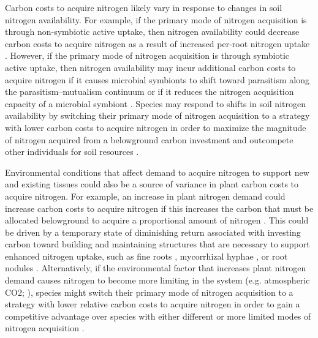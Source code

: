 Carbon costs to acquire nitrogen likely vary in response to changes in soil nitrogen availability. For example, if the primary mode of nitrogen acquisition is through non-symbiotic active uptake, then nitrogen availability could decrease carbon costs to acquire nitrogen as a result of increased per-root nitrogen uptake . However, if the primary mode of nitrogen acquisition is through symbiotic active uptake, then nitrogen availability may incur additional carbon costs to acquire nitrogen if it causes microbial symbionts to shift toward parasitism along the parasitism–mutualism continuum  or if it reduces the nitrogen acquisition capacity of a microbial symbiont . Species may respond to shifts in soil nitrogen availability by switching their primary mode of nitrogen acquisition to a strategy with lower carbon costs to acquire nitrogen in order to maximize the magnitude of nitrogen acquired from a belowground carbon investment and outcompete other individuals for soil resources .

Environmental conditions that affect demand to acquire nitrogen to support new and existing tissues could also be a source of variance in plant carbon costs to acquire nitrogen. For example, an increase in plant nitrogen demand could increase carbon costs to acquire nitrogen if this increases the carbon that must be allocated belowground to acquire a proportional amount of nitrogen . This could be driven by a temporary state of diminishing return associated with investing carbon toward building and maintaining structures that are necessary to support enhanced nitrogen uptake, such as fine roots , mycorrhizal hyphae , or root nodules . Alternatively, if the environmental factor that increases plant nitrogen demand causes nitrogen to become more limiting in the system (e.g. atmospheric CO2; ), species might switch their primary mode of nitrogen acquisition to a strategy with lower relative carbon costs to acquire nitrogen in order to gain a competitive advantage over species with either different or more limited modes of nitrogen acquisition .

